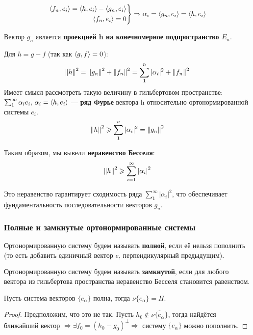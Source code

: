 \documentclass[12pt]{article}
\begin{document}
			$$
		    	\left.
			    \begin{aligned}
			        \left\langle f_n, e_i \right\rangle = \left\langle h, e_i \right\rangle - \left\langle g_n, e_i \right\rangle \\
			        \left\langle f_n, e_i \right\rangle = 0
		    	\end{aligned}
			    \right\} \Rightarrow \alpha_i = \left\langle g_n, e_i \right\rangle = \left\langle h, e_i \right\rangle
			$$

			Вектор $g_n$ является \textbf{проекцией h на конечномерное подпространство $E_n$}.

			Для $h = g + f$ (так как $\left\langle g, f \right\rangle = 0$):
			$$ \left\| h \right\|^2 = \left\| g_n \right\|^2 + \left\| f_n \right\|^2 = \sum_1^n |\alpha_i|^2 + \left\| f_n \right\|^2$$
			Имеет смысл рассмотреть такую величину в гильбертовом пространстве: 
			$\sum_1^{\infty} \alpha_i e_i,\, \alpha_i = \left\langle h, e_i \right\rangle$ --- \textbf{ряд Фурье} вектора h относительно ортонормированной системы $e_i$.
			$$ \left\| h \right\|^2 \geqslant \sum_1^n |\alpha_i|^2 = \left\| g_n \right\|^2 $$
	
			Таким образом, мы вывели \textbf{неравенство Бесселя}:
			$$ \left\| h \right\|^2 \geqslant \sum_{i=1}^{\infty} \left| \alpha_i \right|^2 $$

			Это неравенство гарантирует сходимость ряда $\sum_1^{\infty} |\alpha_i|^2$, что обеспечивает
			фундаментальность последовательности векторов $g_n$.

		\subsubsection{Полные и замкнутые ортонормированные системы}

			\begin{defi}
				Ортонормированную систему будем называть \textbf{полной}, если её нельзя пополнить 
				(то есть добавить единичный вектор $e$, перпендикулярный предыдущим).
			\end{defi}

			\begin{defi}
				Ортонормированную систему будем называть \textbf{замкнутой}, если для любого вектора из 
				гильбертова пространства неравенство Бесселя становится равенством.
			\end{defi}

			\begin{state}
				Пусть система векторов $\{ e_\alpha \}$ полна, тогда $\overline{ \nu \{ e_\alpha \} } = H$.
			\end{state}
			\begin{proof}
				Предположим, что это не так. Пусть $h_0 \notin \overline{ \nu \{ e_\alpha \} }$, тогда найдётся ближайший вектор $\Rightarrow
				\exists f_0 	= (h_0 - g_0)^\perp	\Rightarrow$ систему $\{ e_{\alpha} \}$ можно пополнить.
			\end{proof}
\end{document}
